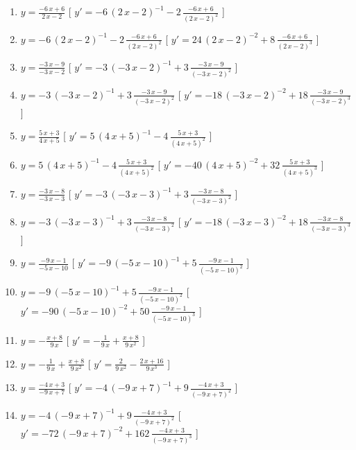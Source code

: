\begin{esercizio}
\begin{enumerate}
\item $y= {\frac {-6\,x+6}{2\,x-2}} $ \hfill [ $y'= -6\, \left( 2\,x-2 \right) ^{-1}-2\,{\frac {-6\,x+6}{ \left( 2\,x-2 \right) ^{2}}}$ ]
\item $y= -6\, \left( 2\,x-2 \right) ^{-1}-2\,{\frac {-6\,x+6}{ \left( 2\,x-2 \right) ^{2}}} $ \hfill [ $y'= 24\, \left( 2\,x-2 \right) ^{-2}+8\,{\frac {-6\,x+6}{ \left( 2\,x-2 \right) ^{3}}}$ ]
\item $y= {\frac {-3\,x-9}{-3\,x-2}} $ \hfill [ $y'= -3\, \left( -3\,x-2 \right) ^{-1}+3\,{\frac {-3\,x-9}{ \left( -3\,x-2 \right) ^{2}}}$ ]
\item $y= -3\, \left( -3\,x-2 \right) ^{-1}+3\,{\frac {-3\,x-9}{ \left( -3\,x-2 \right) ^{2}}} $ \hfill [ $y'= -18\, \left( -3\,x-2 \right) ^{-2}+18\,{\frac {-3\,x-9}{ \left( -3\,x-2 \right) ^{3}}}$ ]
\item $y= {\frac {5\,x+3}{4\,x+5}} $ \hfill [ $y'= 5\, \left( 4\,x+5 \right) ^{-1}-4\,{\frac {5\,x+3}{ \left( 4\,x+5 \right) ^{2}}}$ ]
\item $y= 5\, \left( 4\,x+5 \right) ^{-1}-4\,{\frac {5\,x+3}{ \left( 4\,x+5 \right) ^{2}}} $ \hfill [ $y'= -40\, \left( 4\,x+5 \right) ^{-2}+32\,{\frac {5\,x+3}{ \left( 4\,x+5 \right) ^{3}}}$ ]
\item $y= {\frac {-3\,x-8}{-3\,x-3}} $ \hfill [ $y'= -3\, \left( -3\,x-3 \right) ^{-1}+3\,{\frac {-3\,x-8}{ \left( -3\,x-3 \right) ^{2}}}$ ]
\item $y= -3\, \left( -3\,x-3 \right) ^{-1}+3\,{\frac {-3\,x-8}{ \left( -3\,x-3 \right) ^{2}}} $ \hfill [ $y'= -18\, \left( -3\,x-3 \right) ^{-2}+18\,{\frac {-3\,x-8}{ \left( -3\,x-3 \right) ^{3}}}$ ]
\item $y= {\frac {-9\,x-1}{-5\,x-10}} $ \hfill [ $y'= -9\, \left( -5\,x-10 \right) ^{-1}+5\,{\frac {-9\,x-1}{ \left( -5\,x-10 \right) ^{2}}}$ ]
\item $y= -9\, \left( -5\,x-10 \right) ^{-1}+5\,{\frac {-9\,x-1}{ \left( -5\,x-10 \right) ^{2}}} $ \hfill [ $y'= -90\, \left( -5\,x-10 \right) ^{-2}+50\,{\frac {-9\,x-1}{ \left( -5\,x-10 \right) ^{3}}}$ ]
\item $y= -{\frac {x+8}{9\,x}} $ \hfill [ $y'= -{\frac {1}{9\,x}}+{\frac {x+8}{9\,{x}^{2}}}$ ]
\item $y= -{\frac {1}{9\,x}}+{\frac {x+8}{9\,{x}^{2}}} $ \hfill [ $y'= {\frac {2}{9\,{x}^{2}}}-{\frac {2\,x+16}{9\,{x}^{3}}}$ ]
\item $y= {\frac {-4\,x+3}{-9\,x+7}} $ \hfill [ $y'= -4\, \left( -9\,x+7 \right) ^{-1}+9\,{\frac {-4\,x+3}{ \left( -9\,x+7 \right) ^{2}}}$ ]
\item $y= -4\, \left( -9\,x+7 \right) ^{-1}+9\,{\frac {-4\,x+3}{ \left( -9\,x+7 \right) ^{2}}} $ \hfill [ $y'= -72\, \left( -9\,x+7 \right) ^{-2}+162\,{\frac {-4\,x+3}{ \left( -9\,x+7 \right) ^{3}}}$ ]

\end{enumerate}
\end{esercizio}
